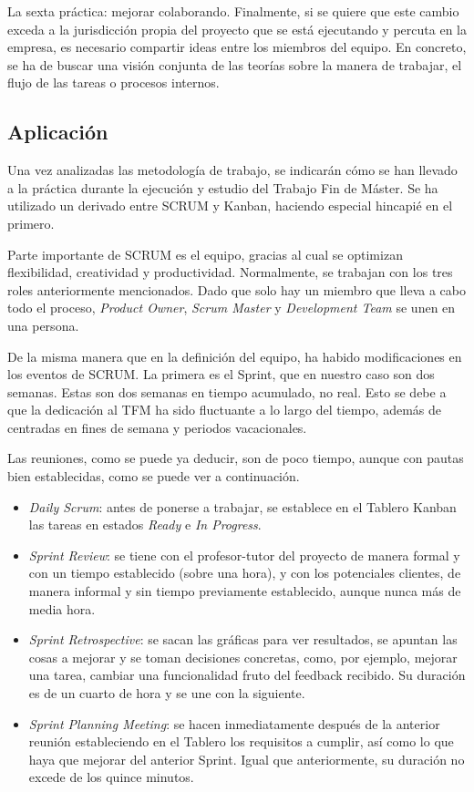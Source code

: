 La sexta práctica: mejorar colaborando. Finalmente, si se quiere que este cambio exceda a la jurisdicción propia del proyecto que se está ejecutando y percuta en la empresa, es necesario compartir ideas entre los miembros del equipo. En concreto, se ha de buscar una visión conjunta de las teorías sobre la manera de trabajar, el flujo de las tareas o procesos internos.

\subsection{Aplicación}
Una vez analizadas las metodología de trabajo, se indicarán cómo se han llevado a la práctica durante la ejecución y estudio del Trabajo Fin de Máster. Se ha utilizado un derivado entre SCRUM y Kanban, haciendo especial hincapié en el primero.

Parte importante de SCRUM es el equipo, gracias al cual se optimizan flexibilidad, creatividad y productividad. Normalmente, se trabajan con los tres roles anteriormente mencionados. Dado que solo hay un miembro que lleva a cabo todo el proceso, \textit{Product Owner}, \textit{Scrum Master} y \textit{Development Team} se unen en una persona.

De la misma manera que en la definición del equipo, ha habido modificaciones en los eventos de SCRUM. La primera es el Sprint, que en nuestro caso son dos semanas. Estas son dos semanas en tiempo acumulado, no real. Esto se debe a que la dedicación al TFM ha sido fluctuante a lo largo del tiempo, además de centradas en fines de semana y periodos vacacionales.

Las reuniones, como se puede ya deducir, son de poco tiempo, aunque con pautas bien establecidas, como se puede ver a continuación.
\begin{itemize}
    \item \textit{Daily Scrum}: antes de ponerse a trabajar, se establece en el Tablero Kanban las tareas en estados \textit{Ready} e \textit{In Progress}.
    \item \textit{Sprint Review}: se tiene con el profesor-tutor del proyecto de manera formal y con un tiempo establecido (sobre una hora), y con los potenciales clientes, de manera informal y sin tiempo previamente establecido, aunque nunca más de media hora.
    \item \textit{Sprint Retrospective}: se sacan las gráficas para ver resultados, se apuntan las cosas a mejorar y se toman decisiones concretas, como, por ejemplo, mejorar una tarea, cambiar una funcionalidad fruto del feedback recibido. Su duración es de un cuarto de hora y se une con la siguiente.
    \item \textit{Sprint Planning Meeting}: se hacen inmediatamente después de la anterior reunión estableciendo en el Tablero los requisitos a cumplir, así como lo que haya que mejorar del anterior Sprint. Igual que anteriormente, su duración no excede de los quince minutos.
\end{itemize}

